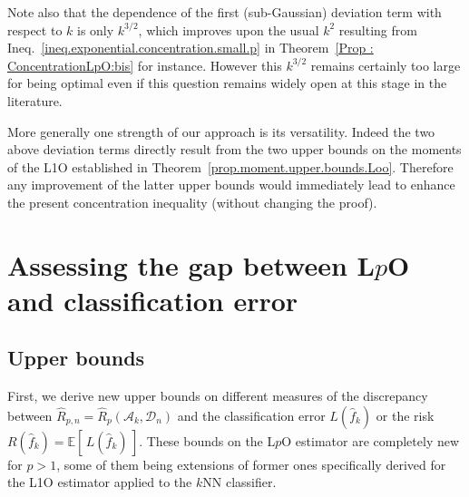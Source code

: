 \documentclass[twoside,11pt]{article}
\numberwithin{equation}{section}
\newcommand{\1}{\mathds{1}}%
\newcommand{\paren}[1]{\left( #1 \right)}
\newcommand{\croch}[1]{\left[\, #1 \,\right]}
\newcommand{\E}{\mathbb{E}}
\newcommand{\Rh}{\widehat{R}}
\newcommand{\Rhp}{\Rh_p}
\newcommand{\Dn}{\mathcal{D}_n}
\newcommand{\A}{\mathcal{A}}
\numberwithin{equation}{section}
\theoremstyle{plain}
\begin{document}
Note also that the dependence of the first (sub-Gaussian) deviation term with respect to $k$ is only $k^{3/2}$, which improves upon the usual $k^2$ resulting from Ineq.~\eqref{ineq.exponential.concentration.small.p} in Theorem~\ref{Prop : ConcentrationLpO:bis} for instance. However this $k^{3/2}$ remains certainly too large for being optimal even if this question remains widely open at this stage in the literature.

More generally one strength of our approach is its versatility. Indeed the two above deviation terms directly result from the two upper bounds on the moments of the L1O established in Theorem~\ref{prop.moment.upper.bounds.Loo}. Therefore any improvement of the latter upper bounds would immediately lead to enhance the present concentration inequality (without changing the proof).













\section{Assessing the gap between L$p$O and classification error} \label{Section:Old}

%
\subsection{Upper bounds}
First, we derive new upper bounds on different measures of the discrepancy between $\Rh_{p,n} = \Rhp\paren{\A_k, \Dn }$ and the classification error $L(\hat f_k)$ or the risk $R(\hat f_k) = \E\croch{L(\hat f_k)}$.
%
These bounds on the L$p$O estimator are completely new for $p>1$, some of them being extensions of former ones specifically derived for the L1O estimator applied to the $k$NN classifier.
%
\end{document}
